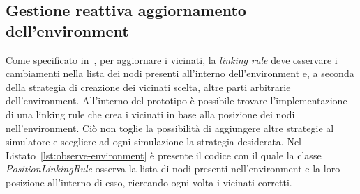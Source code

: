 \documentclass[12pt,a4paper,openright,twoside]{book}
\begin{document}




\subsection{Gestione reattiva aggiornamento dell'environment}
Come specificato in~, per aggiornare i vicinati, la \textit{linking rule} deve osservare i cambiamenti nella lista dei nodi presenti all'interno dell'environment e, a seconda della strategia di creazione dei vicinati scelta, altre parti arbitrarie dell'environment. 
All'interno del prototipo è possibile trovare l'implementazione di una linking rule che crea i vicinati in base alla posizione dei nodi nell'environment. Ciò non toglie la possibilità di aggiungere altre strategie al simulatore e scegliere ad ogni simulazione la strategia desiderata. 
Nel Listato~\ref{lst:observe-environment} è presente il codice con il quale la classe \textit{PositionLinkingRule} osserva la lista di nodi presenti nell'environment e la loro posizione all'interno di esso, ricreando ogni volta i vicinati corretti. 


\end{document}
